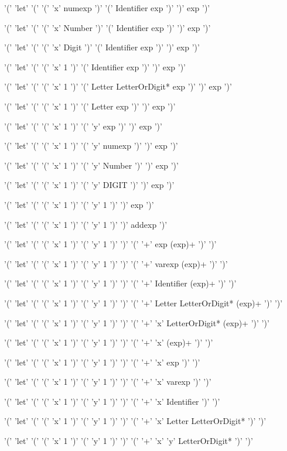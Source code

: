 \documentclass[11pt]{article}
\begin{document}
\begin{enumerate}
		'(' 'let' '(' '(' 'x' numexp ')' '(' Identifier exp ')' ')' exp ')'

		'(' 'let' '(' '(' 'x' Number ')' '(' Identifier exp ')' ')' exp ')'

		'(' 'let' '(' '(' 'x' Digit ')' '(' Identifier exp ')' ')' exp ')'

		'(' 'let' '(' '(' 'x' 1 ')' '(' Identifier exp ')' ')' exp ')'

		'(' 'let' '(' '(' 'x' 1 ')' '(' Letter LetterOrDigit* exp ')' ')' exp ')'

		'(' 'let' '(' '(' 'x' 1 ')' '(' Letter exp ')' ')' exp ')'

		'(' 'let' '(' '(' 'x' 1 ')' '(' 'y' exp ')' ')' exp ')'

		'(' 'let' '(' '(' 'x' 1 ')' '(' 'y' numexp ')' ')' exp ')'

		'(' 'let' '(' '(' 'x' 1 ')' '(' 'y' Number ')' ')' exp ')'

		'(' 'let' '(' '(' 'x' 1 ')' '(' 'y' DIGIT ')' ')' exp ')'

		'(' 'let' '(' '(' 'x' 1 ')' '(' 'y' 1 ')' ')' exp ')'

		'(' 'let' '(' '(' 'x' 1 ')' '(' 'y' 1 ')' ')' addexp ')'

		'(' 'let' '(' '(' 'x' 1 ')' '(' 'y' 1 ')' ')' '(' '+' exp (exp)+ ')' ')'

		'(' 'let' '(' '(' 'x' 1 ')' '(' 'y' 1 ')' ')' '(' '+' varexp (exp)+ ')' ')'

		'(' 'let' '(' '(' 'x' 1 ')' '(' 'y' 1 ')' ')' '(' '+' Identifier (exp)+ ')' ')'

		'(' 'let' '(' '(' 'x' 1 ')' '(' 'y' 1 ')' ')' '(' '+' Letter LetterOrDigit* (exp)+ ')' ')'

		'(' 'let' '(' '(' 'x' 1 ')' '(' 'y' 1 ')' ')' '(' '+' 'x' LetterOrDigit* (exp)+ ')' ')'

		'(' 'let' '(' '(' 'x' 1 ')' '(' 'y' 1 ')' ')' '(' '+' 'x' (exp)+ ')' ')'

		'(' 'let' '(' '(' 'x' 1 ')' '(' 'y' 1 ')' ')' '(' '+' 'x' exp ')' ')'

		'(' 'let' '(' '(' 'x' 1 ')' '(' 'y' 1 ')' ')' '(' '+' 'x' varexp ')' ')'

		'(' 'let' '(' '(' 'x' 1 ')' '(' 'y' 1 ')' ')' '(' '+' 'x' Identifier ')' ')'

		'(' 'let' '(' '(' 'x' 1 ')' '(' 'y' 1 ')' ')' '(' '+' 'x' Letter LetterOrDigit* ')' ')'

		'(' 'let' '(' '(' 'x' 1 ')' '(' 'y' 1 ')' ')' '(' '+' 'x' 'y' LetterOrDigit* ')' ')'


\end{enumerate}
\end{document}
